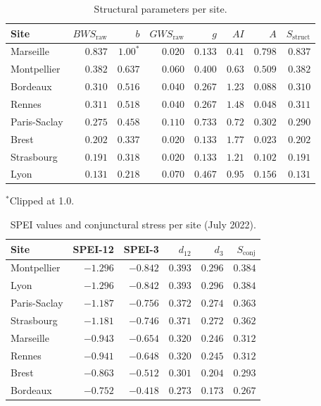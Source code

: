 \documentclass[11pt,a4paper]{article}
\begin{document}
\begin{table}[h]
\centering
\small
\caption{Structural parameters per site.}
\label{tab:appA1}
\begin{tabular}{lrrrrrrr}
\toprule
Site & $BWS_{\text{raw}}$ & $b$ & $GWS_{\text{raw}}$ & $g$ & $AI$ & $A$ & $S_{\text{struct}}$ \\
\midrule
Marseille    & $0.837$ & $1.00^*$ & $0.020$ & $0.133$ & $0.41$ & $0.798$ & $0.837$ \\
Montpellier  & $0.382$ & $0.637$  & $0.060$ & $0.400$ & $0.63$ & $0.509$ & $0.382$ \\
Bordeaux     & $0.310$ & $0.516$  & $0.040$ & $0.267$ & $1.23$ & $0.088$ & $0.310$ \\
Rennes       & $0.311$ & $0.518$  & $0.040$ & $0.267$ & $1.48$ & $0.048$ & $0.311$ \\
Paris-Saclay & $0.275$ & $0.458$  & $0.110$ & $0.733$ & $0.72$ & $0.302$ & $0.290$ \\
Brest        & $0.202$ & $0.337$  & $0.020$ & $0.133$ & $1.77$ & $0.023$ & $0.202$ \\
Strasbourg   & $0.191$ & $0.318$  & $0.020$ & $0.133$ & $1.21$ & $0.102$ & $0.191$ \\
Lyon         & $0.131$ & $0.218$  & $0.070$ & $0.467$ & $0.95$ & $0.156$ & $0.131$ \\
\bottomrule
\end{tabular}

\vspace{0.3em}
{\footnotesize $^*$Clipped at 1.0.}
\end{table}

\begin{table}[h]
\centering
\small
\caption{SPEI values and conjunctural stress per site (July 2022).}
\label{tab:appA2}
\begin{tabular}{lrrrrr}
\toprule
Site & SPEI-12 & SPEI-3 & $d_{12}$ & $d_3$ & $S_{\text{conj}}$ \\
\midrule
Montpellier  & $-1.296$ & $-0.842$ & $0.393$ & $0.296$ & $0.384$ \\
Lyon         & $-1.296$ & $-0.842$ & $0.393$ & $0.296$ & $0.384$ \\
Paris-Saclay & $-1.187$ & $-0.756$ & $0.372$ & $0.274$ & $0.363$ \\
Strasbourg   & $-1.181$ & $-0.746$ & $0.371$ & $0.272$ & $0.362$ \\
Marseille    & $-0.943$ & $-0.654$ & $0.320$ & $0.246$ & $0.312$ \\
Rennes       & $-0.941$ & $-0.648$ & $0.320$ & $0.245$ & $0.312$ \\
Brest        & $-0.863$ & $-0.512$ & $0.301$ & $0.204$ & $0.293$ \\
Bordeaux     & $-0.752$ & $-0.418$ & $0.273$ & $0.173$ & $0.267$ \\
\bottomrule
\end{tabular}
\end{table}
\end{document}
